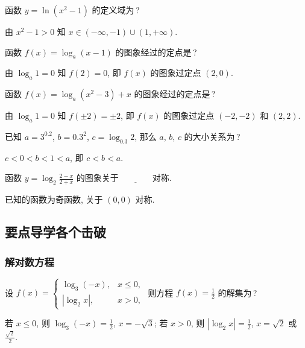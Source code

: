   \lianxi
  \begin{exercise}
    函数 $y=\ln(x^2 -1)$ 的定义域为\,?
  \end{exercise}

  \beginsolution
    由 $x^2-1>0$ 知 $x\in(-\infty,-1)\cup (1,+\infty)$.
  \endsolution
  
  \begin{exercise}
    函数 $f(x)=\log_a (x-1)$ 的图象经过的定点是\,?
  \end{exercise}

  \beginsolution
    由 $\log_a 1=0$ 知 $f(2)=0$, 即 $f(x)$ 的图象过定点 $(2,0)$.
    
    \varexercise 函数 $f(x)=\log_a (x^2-3)+x$ 的图象经过的定点是\,?
    
    由 $\log_a 1=0$ 知 $f(\pm2)=\pm2$, 即 $f(x)$ 的图象过定点 $(-2,-2)$ 和 $(2,2)$.
  \endsolution
  
  \begin{exercise}
    已知 $a=3^{0.2}$, $b=0.3^2$, $c=\log_{0.3}2$, 
    那么 $a$, $b$, $c$ 的大小关系为\,?
  \end{exercise}

  \beginsolution
    $c<0<b<1<a$, 即 $c<b<a$.
  \endsolution
  
  \begin{exercise}
    函数 $y=\log_2\frac{2-x}{2+x}$ 的图象关于$\underline{\qquad\qquad}$对称.
  \end{exercise}

  \beginsolution
    已知的函数为奇函数, 关于 $(0,0)$ 对称.
  \endsolution
  
  \subsection{要点导学\quad 各个击破}
  \subsubsection{解对数方程}
  \begin{example}
    设 $f(x)=\begin{cases}
      \log_3 (-x), & x\leqslant 0,\\
      |\log_2 x|, & x>0,
    \end{cases}$ 则方程 $f(x)=\frac12$ 的解集为\,?
  \end{example}

  \beginsolution
    若 $x\leqslant 0$, 则 $\log_3 (-x)=\frac12$, $x=-\sqrt3$;
    若 $x> 0$, 则 $|\log_2 x|=\frac12$, $x=\sqrt2$ 或 $\frac{\sqrt2}2$.
    
